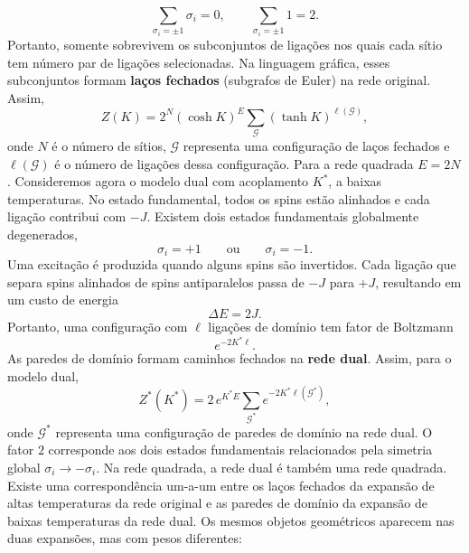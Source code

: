\documentclass[11pt,a4paper]{article}
\begin{document}
%
\begin{equation}
    \sum_{\sigma_i=\pm1}\sigma_i=0,
    \qquad
    \sum_{\sigma_i=\pm1}1=2.
\end{equation}
%
Portanto, somente sobrevivem os subconjuntos de ligações nos quais cada sítio tem número par de ligações selecionadas. Na linguagem gráfica, esses subconjuntos formam \textbf{laços fechados} (subgrafos de Euler) na rede original. Assim,
%
\begin{equation}
    Z(K)
    =
    2^N
    (\cosh K)^E
    \sum_{\mathcal G}
    (\tanh K)^{\ell(\mathcal G)},
    \label{eq:Z_high_loops}
\end{equation}
%
onde \(N\) é o número de sítios, \(\mathcal G\) representa uma configuração de laços fechados e \(\ell(\mathcal G)\) é o número de ligações dessa configuração. Para a rede quadrada $E=2N$. Consideremos agora o modelo dual com acoplamento \(K^*\), a baixas temperaturas. No estado fundamental, todos os spins estão alinhados e cada ligação contribui com \(-J\). Existem dois estados fundamentais globalmente degenerados,
%
\begin{equation}
    \sigma_i=+1
    \qquad\text{ou}\qquad
    \sigma_i=-1.
\end{equation}
%
Uma excitação é produzida quando alguns spins são invertidos. Cada ligação que separa spins alinhados de spins antiparalelos passa de \(-J\) para \(+J\), resultando em um custo de energia
%
\begin{equation}
    \Delta E=2J.
\end{equation}
%
Portanto, uma configuração com \(\ell\) ligações de domínio tem fator de Boltzmann
%
\begin{equation}
    e^{-2K^*\ell}.
\end{equation}
%
As paredes de domínio formam caminhos fechados na \textbf{rede dual}. Assim, para o modelo dual,
%
\begin{equation}
    Z^*(K^*)
    =
    2\,e^{K^* E}
    \sum_{\mathcal G^*}
    e^{-2K^*\ell(\mathcal G^*)},
    \label{eq:low_temp_expansion}
\end{equation}
%
onde \(\mathcal G^*\) representa uma configuração de paredes de domínio na rede dual. O fator \(2\) corresponde aos dois estados fundamentais relacionados pela simetria global \(\sigma_i\to-\sigma_i\). Na rede quadrada, a rede dual é também uma rede quadrada. Existe uma correspondência um-a-um entre os laços fechados da expansão de altas temperaturas da rede original e as paredes de domínio da expansão de baixas temperaturas da rede dual. Os mesmos objetos geométricos aparecem nas duas expansões, mas com pesos diferentes:
\end{document}
